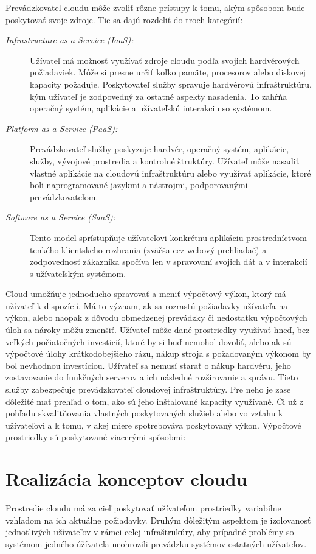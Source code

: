 \documentclass[printed,11pt,twoside,color,cover,table]{fithesis3}
\begin{document}
Prevádzkovateľ cloudu môže zvoliť rôzne prístupy k tomu, akým spôsobom bude poskytovať svoje zdroje. Tie sa dajú rozdeliť do troch kategórií:

\begin{description}
\item[\emph{Infrastructure as a Service (IaaS):}] Užívateľ má možnosť využívať zdroje cloudu podľa svojich hardvérových požiadaviek.
Môže si presne určiť koľko pamäte, procesorov alebo diskovej kapacity požaduje. Poskytovateľ služby spravuje hardvérovú infraštruktúru,
kým užívateľ je zodpovedný za ostatné aspekty nasadenia. To zahŕňa operačný systém, aplikácie a užívateľskú interakciu so systémom. \cite{cloud_bible}
\item[\emph{Platform as a Service (PaaS):}] Prevádzkovateľ služby poskyzuje hardvér, operačný systém, aplikácie, služby, vývojové prostredia
a kontrolné štruktúry. Užívateľ môže nasadiť vlastné aplikácie na cloudovú infraštruktúru alebo využívať aplikácie, ktoré boli naprogramované
jazykmi a nástrojmi, podporovanými prevádzkovateľom. %
\item[\emph{Software as a Service (SaaS):}] Tento model sprístupňuje užívateľovi konkrétnu aplikáciu prostredníctvom tenkého klientskeho 
rozhrania (zväčša cez webový prehliadač) a zodpovednosť zákazníka spočíva len v spravovaní svojich dát a v interakcií s užívateľským systémom.\cite{cloud_bible}
\end{description}

Cloud umožňuje jednoducho spravovať a meniť výpočtový výkon, ktorý má užívateľ k dispozícií. Má to význam, ak sa rozrastú požiadavky užívateľa na výkon, alebo naopak z dôvodu obmedzenej prevádzky či 
nedostatku výpočtových úloh sa nároky môžu zmenšiť. Užívateľ môže dané prostriedky využívať hneď, bez veľkých počiatočných investicií, ktoré by si buď nemohol dovoliť, alebo ak sú výpočtové úlohy krátkodobejšieho rázu, nákup
stroja s požadovaným výkonom by bol nevhodnou investíciou. Užívateľ sa nemusí starať o nákup hardvéru, jeho zostavovanie do funkčných serverov a ich následné rozširovanie a správu. Tieto služby zabezpečuje prevádzkovateľ cloudovej infraštruktúry.
Pre neho je zase dôležité mať prehľad o tom, ako sú jeho inštalované kapacity využívané. Či už z pohľadu skvalitňovania vlastných poskytovaných služieb alebo vo vzťahu k užívateľovi a k tomu, v akej miere spotrebováva poskytovaný výkon.
Výpočtové prostriedky sú poskytované viacerými spôsobmi:

\section{Realizácia konceptov cloudu}
Prostredie cloudu má za cieľ poskytovať užívateľom prostriedky variabilne vzhľadom na ich aktuálne požiadavky. Druhým dôležitým aspektom je
izolovanosť jednotlivých užívateľov v rámci celej infraštrukúry, aby prípadné problémy so systémom jedného úžívateľa neohrozili prevádzku
systémov ostatných užívateľov.
\end{document}
